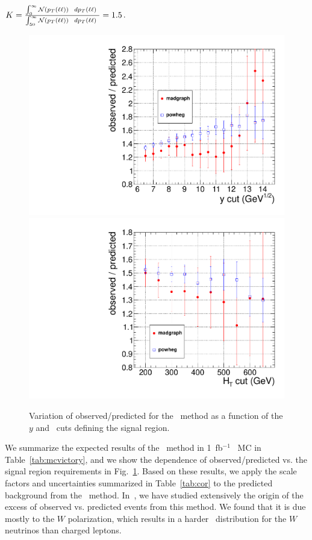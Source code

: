 \begin{center}
$ K = \frac{\int_0^{\infty} {\cal N}(p_T(\ell\ell))~~dp_T(\ell\ell)~}{\int_{50}^{\infty} {\cal N}(p_T(\ell\ell))~~dp_T(\ell\ell)~} = 1.5$.
\end{center}

\begin{figure}[hbt]
\begin{center}
\includegraphics[width=0.48\linewidth]{plots/victory_yvary.pdf}
\includegraphics[width=0.48\linewidth]{plots/victory_htvary.pdf}
\caption{\label{fig:victory}\protect Variation of observed/predicted
for the \ptll\ method as a function of the $y$ and \Ht\ cuts defining
the signal region.}
\end{center}
\end{figure}

We summarize the expected results of the \ptll\ method in 1~fb$^{-1}$ \ttbar\ MC in Table~\ref{tab:mcvictory},
and we show the dependence of observed/predicted vs. the signal region requirements in Fig.~\ref{fig:victory}.
Based on these results, we apply the scale factors and uncertainties summarized in Table~\ref{tab:cor} to the
predicted background from the \ptll\ method. In~\cite{ref:osnote}, we have studied extensively the origin
of the excess of observed vs. predicted events from this method. We found that it is due mostly to 
the $W$ polarization, which results in a harder \pt\ distribution for the $W$ neutrinos than charged leptons.

